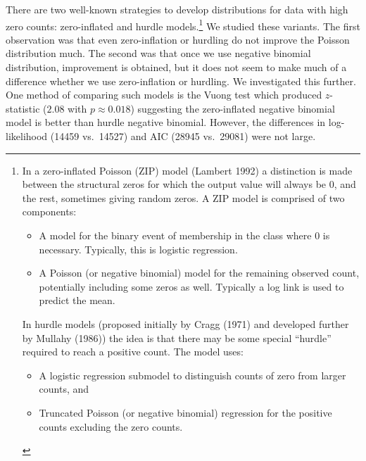 \documentclass[10pt,dvipsnames]{scrartcl}
\begin{document}
There are two well-known strategies to develop distributions for data
with high zero counts: zero-inflated and hurdle
models.\footnote{In a zero-inflated Poisson (ZIP) model (Lambert 1992) a distinction is made between   the structural zeros for which the output value  will always be 0, and the rest, sometimes giving random zeros. A  ZIP model is comprised of two components:

\begin{itemize}
\item  A model for the binary event of membership in the class where 0 is necessary. Typically, this is logistic regression. 

\item  A Poisson (or negative binomial) model for the remaining observed count, potentially including some zeros as well. Typically a log link is used to predict the mean.
\end{itemize}


In hurdle models (proposed initially by Cragg (1971) and developed further by Mullahy (1986)) the idea  is that there may be some special  “hurdle” required to reach a positive count. The model  uses:

\begin{itemize}
\item A logistic regression  submodel to distinguish counts of zero from larger counts, and
\item  Truncated Poisson (or negative binomial) regression for the positive counts  excluding the zero counts.
\end{itemize}} We studied these variants. The first observation was that
even zero-inflation or hurdling do not improve the Poisson distribution
much. The second was that once we use negative binomial distribution,
improvement is obtained, but it does not seem to make much of a
difference whether we use zero-inflation or hurdling. We investigated
this further. One method of comparing such models is the Vuong test
which produced \(z\)-statistic (\(2.08\) with \(p\approx 0.018\))
suggesting the zero-inflated negative binomial model is better than
hurdle negative binomial. However, the differences in log-likelihood
(14459 vs.~14527) and AIC (28945 vs.~29081) were not large.

\footnotesize

\normalsize 

\footnotesize

\normalsize

\footnotesize
\end{document}
